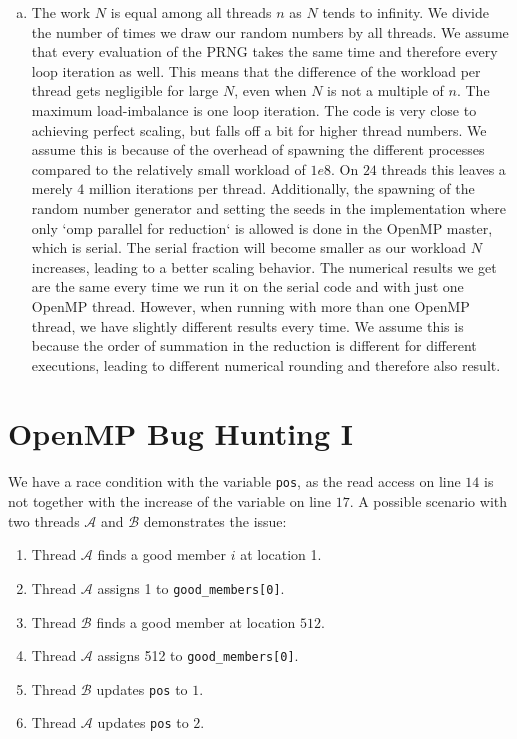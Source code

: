 \documentclass[a4paper,10pt]{article} %
\begin{document}
\begin{enumerate}[b)]
\item
The work $N$ is equal among all threads $n$ as $N$ tends to infinity. We divide the number of times we draw our random numbers by all threads. We assume that every evaluation of the PRNG takes the same time and therefore every loop iteration as well. This means that the difference of the workload per thread gets negligible for large $N$, even when $N$ is not a multiple of $n$. The maximum load-imbalance is one loop iteration. The code is very close to achieving perfect scaling, but falls off a bit for higher thread numbers. We assume this is because of the overhead of spawning the different processes compared to the relatively small workload of $1e8$. On $24$ threads this leaves a merely $4$ million iterations per thread. Additionally, the spawning of the random number generator and setting the seeds in the implementation where only `omp parallel for reduction` is allowed is done in the OpenMP master, which is serial. The serial fraction will become smaller as our workload $N$ increases, leading to a better scaling behavior. The numerical results we get are the same every time we run it on the serial code and with just one OpenMP thread. However, when running with more than one OpenMP thread, we have slightly different results every time. We assume this is because the order of summation in the reduction is different for different executions, leading to different numerical rounding and therefore also result. 

\end{enumerate}

\section{OpenMP Bug Hunting I}
We have a race condition with the variable \texttt{pos}, as the read access on line $14$ is not together with the increase of the variable on line $17$. A possible scenario with two threads $\mathcal{A}$ and $\mathcal{B}$ demonstrates the issue:
\begin{enumerate}
    \item Thread $\mathcal{A}$ finds a good member $i$ at location 1.
    \item Thread $\mathcal{A}$ assigns 1 to \texttt{good\_members[0]}.
    \item Thread $\mathcal{B}$ finds a good member at location $512$.
    \item Thread $\mathcal{A}$ assigns 512 to \texttt{good\_members[0]}.
    \item Thread $\mathcal{B}$ updates \texttt{pos} to $1$.
    \item Thread $\mathcal{A}$ updates \texttt{pos} to $2$.
\end{enumerate}
\end{document}
